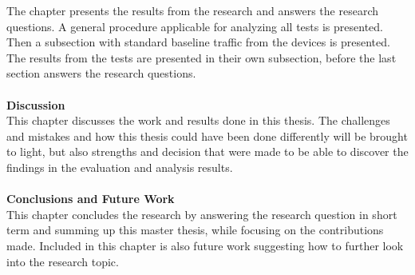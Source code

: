 The chapter presents the results from the research and answers the research questions. A general procedure applicable for analyzing all tests is presented. Then a subsection with standard baseline traffic from the devices is presented. The results from the tests are presented in their own subsection, before the last section answers the research questions.  
\\\\
\textbf{Discussion}
\\
This chapter discusses the work and results done in this thesis. The challenges and mistakes and how this thesis could have been done differently will be brought to light, but also strengths and decision that were made to be able to discover the findings in the evaluation and analysis results. 
\\\\
\textbf{Conclusions and Future Work}
\\
This chapter concludes the research by answering the research question in short term and summing up this master thesis, while focusing on the contributions made. Included in this chapter is also future work suggesting how to further look into the research topic.